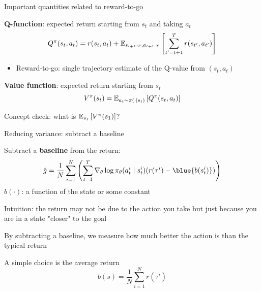 \documentclass[usenames,dvipsnames,notes,11pt,aspectratio=169,hyperref={colorlinks=true, linkcolor=blue}]{beamer}
\begin{document}
\begin{frame}
    {Important quantities related to reward-to-go}
    \begin{wideitemize}[<+->]
        \item {\bf Q-function}:
                    expected return starting from $s_t$ and taking $a_t$
            $$Q^\pi(s_t, a_t)=r(s_t, a_t) + \mathbb{E}_{s_{t+1:T}, a_{t+1:T}}\left[ \sum_{t'=t+1}^T r(s_{t'}, a_{t'}) \right]$$
            \begin{itemize}
                \item Reward-to-go: single trajectory estimate of the Q-value from $(s_t, a_t)$
            \end{itemize}

        \item {\bf Value function}: 
                    expected return starting from $s_t$
            $$V^\pi(s_t) = \mathbb{E}_{a_t\sim\pi(\cdot\mid s_t)}\left[ Q^\pi(s_t, a_t) \right]$$

        \item Concept check: what is $\mathbb{E}_{s_1}\left[ V^\pi(s_1) \right]$?
    \end{wideitemize}
\end{frame}

\begin{frame}
    {Reducing variance: subtract a baseline}

    \begin{wideitemize}[<+->]
        \item Subtract a {\bf baseline} from the return:
            $$
            \hat{g} = \frac{1}{N}\sum_{i=1}^N
            \p{\sum_{t=1}^T \nabla_\theta\log \pi_\theta(a_t^i\mid s_t^i)
            (r(\tau^i) - \blue{b(s_t^i)})}
            $$
            $b(\cdot)$: a function of the state or some constant 
        \item Intuition: the return may not be due to the action you take but just because you are in a state "closer" to the goal %
        \item By subtracting a baseline, we measure how much better the action is than the typical return
        \item A simple choice is the average return
            $$
            b(s) = \frac{1}{N}\sum_{i=1}^N r(\tau^i)
            $$
    \end{wideitemize}
\end{frame}
\end{document}
